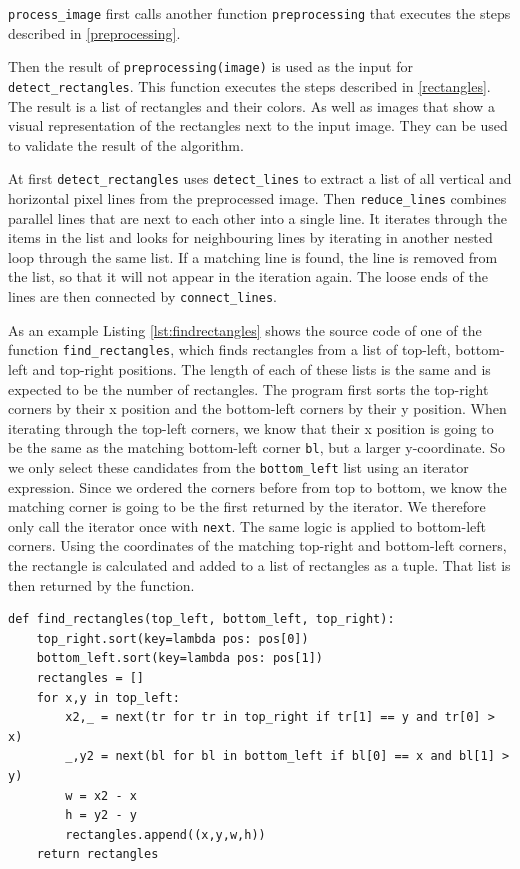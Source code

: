 \documentclass[serif,article,noparskip]{agse-thesis}
\begin{document}
\texttt{process\_image} first calls another function \texttt{preprocessing} that
executes the steps described in \ref{preprocessing}.

Then the result of \texttt{preprocessing(image)} is used as the input for
\texttt{detect\_rectangles}. This function executes the steps described in
\ref{rectangles}. The result is a list of rectangles and their colors. As well
as images that show a visual representation of the rectangles next to the input
image. They can be used to validate the result of the algorithm.

At first \texttt{detect\_rectangles} uses \texttt{detect\_lines} to extract a
list of all vertical and horizontal pixel lines from the preprocessed image.
Then \texttt{reduce\_lines} combines parallel lines that are next to each other
into a single line. It iterates through the items in the list and looks for
neighbouring lines by iterating in another nested loop through the same list. If
a matching line is found, the line is removed from the list, so that it will not
appear in the iteration again. The loose ends of the lines are then connected by
\texttt{connect\_lines}.

As an example Listing \ref{lst:findrectangles} shows the source code of
one of the function \texttt{find\_rectangles}, which finds rectangles from a
list of top-left, bottom-left and top-right positions. The length of each of
these lists is the same and is expected to be the number of rectangles. The
program first sorts the top-right corners by their x position and the
bottom-left corners by their y position. When iterating through the top-left
corners, we know that their x position is going to be the same as the matching
bottom-left corner \texttt{bl}, but a larger y-coordinate. So we only select
these candidates from the \texttt{bottom\_left} list using an iterator
expression. Since we ordered the corners before from top to bottom, we know the
matching corner is going to be the first returned by the iterator. We therefore
only call the iterator once with \texttt{next}. The same logic is applied to
bottom-left corners. Using the coordinates of the matching top-right and
bottom-left corners, the rectangle is calculated and added to a list of
rectangles as a tuple. That list is then returned by the function.

\begin{minipage}{\linewidth}
\begin{lstlisting}[label=lst:findrectangles,caption=Function for constructing rectangles from corners]
def find_rectangles(top_left, bottom_left, top_right):
    top_right.sort(key=lambda pos: pos[0])
    bottom_left.sort(key=lambda pos: pos[1])
    rectangles = []
    for x,y in top_left:
        x2,_ = next(tr for tr in top_right if tr[1] == y and tr[0] > x)
        _,y2 = next(bl for bl in bottom_left if bl[0] == x and bl[1] > y)
        w = x2 - x
        h = y2 - y
        rectangles.append((x,y,w,h))
    return rectangles
\end{lstlisting}
\end{minipage}
\end{document}
